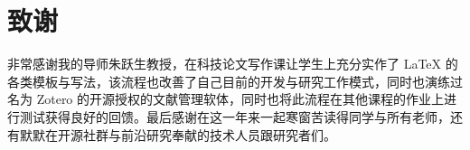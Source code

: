 \chapter{致谢}

非常感谢我的导师朱跃生教授，在科技论文写作课让学生上充分实作了 LaTeX 的各类模板与写法，该流程也改善了自己目前的开发与研究工作模式，同时也演练过名为 Zotero 的开源授权的文献管理软体，同时也将此流程在其他课程的作业上进行测试获得良好的回馈。最后感谢在这一年来一起寒窗苦读得同学与所有老师，还有默默在开源社群与前沿研究奉献的技术人员跟研究者们。